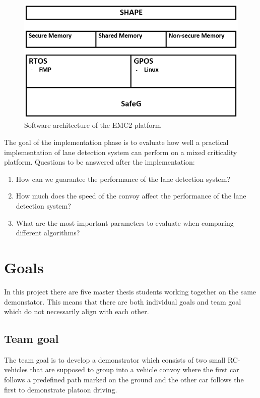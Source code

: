 \begin{figure}[H]
  \includegraphics[width=\textwidth]{./img/architecture.png}
  \centering
  \caption{Software architecture of the EMC2 platform}
  \label{fig:Software architecture of the EMC2 platform}
\end{figure}

The goal of the implementation phase is to evaluate how well a practical implementation of lane detection system can perform on a mixed criticality platform. Questions to be answered after the implementation:

\begin{enumerate}  
\item How can we guarantee the performance of the lane detection system?
\item How much does the speed of the convoy affect the performance of the lane detection system?
\item What are the most important parameters to evaluate when comparing different algorithms?
\end{enumerate}

\section{Goals}
In this project there are five master thesis students working together on the same demonstator. This means that there are both individual goals and team goal which do not necessarily align with each other.

\subsection{Team goal}
The team goal is to develop a demonstrator which consists of two small RC-vehicles that are supposed to group into a vehicle convoy where the first car follows a predefined path marked on the ground and the other car follows the first to demonstrate platoon driving.

